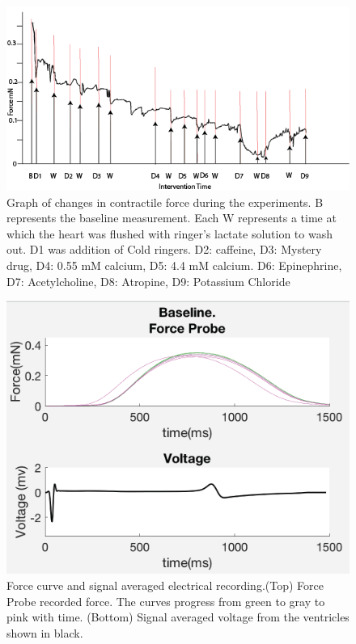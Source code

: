 \documentclass[12pt]{article}
\begin{document}


\begin{figure}[H]
	\label{fig:ForceGraph}
	\centering
	\includegraphics[width = .95\textwidth]{Figures/ForceGraph.png}
	\caption{Graph of changes in contractile force during the experiments. B represents the baseline measurement. Each W represents a time at which the heart was flushed with ringer's lactate solution to wash out. D1 was addition of Cold ringers. D2: caffeine, D3: Mystery drug, D4: 0.55 mM calcium, D5: 4.4 mM calcium. D6: Epinephrine, D7: Acetylcholine, D8: Atropine, D9: Potassium Chloride }
\end{figure}



\begin{figure}[H]
	\label{fig:Baseline}
	\centering
	\includegraphics[width = .95\textwidth]{Figures/Baseline.png}
	\caption{Force curve and signal averaged electrical recording.(Top) Force Probe recorded force. The curves progress from green to gray to pink with time. (Bottom) Signal averaged voltage from the ventricles shown in black. }
\end{figure}
\end{document}
